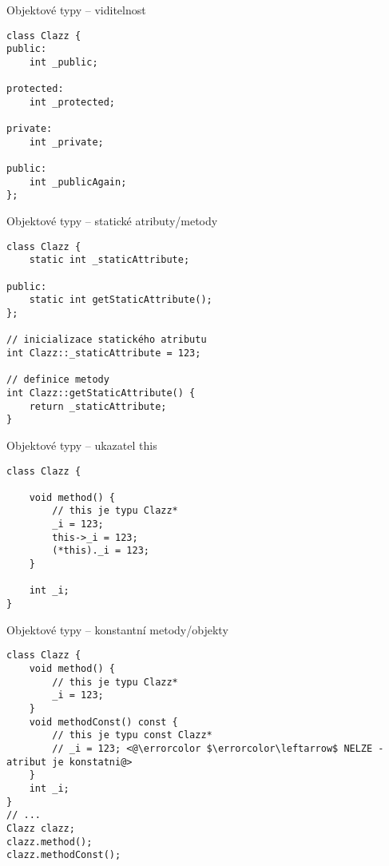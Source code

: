 \begin{frame}[fragile]
\begin{exampleblock}{Objektové typy -- viditelnost} 
\begin{lstlisting}
class Clazz {
public:
	int _public;
	
protected:
	int _protected;
	
private:
	int _private;
	
public:
	int _publicAgain;
};

\end{lstlisting}
\end{exampleblock}
\end{frame}



\begin{frame}[fragile]
\begin{exampleblock}{Objektové typy -- statické atributy/metody} 
\begin{lstlisting}
class Clazz {
	static int _staticAttribute;
	
public:	
	static int getStaticAttribute();
};

// inicializace statického atributu
int Clazz::_staticAttribute = 123;

// definice metody
int Clazz::getStaticAttribute() {
	return _staticAttribute;
}

\end{lstlisting}
\end{exampleblock}
\end{frame}


\begin{frame}[fragile]
\begin{exampleblock}{Objektové typy -- ukazatel this} 
\begin{lstlisting}
class Clazz {
	
	void method() {
		// this je typu Clazz*
		_i = 123;
		this->_i = 123;
		(*this)._i = 123;
	}
	
	int _i;
}

\end{lstlisting}
\end{exampleblock}
\end{frame}

\newcommand{\errorcolor}{\color[rgb]{1.0,0.0,0.0}}

\begin{frame}[fragile]
\begin{exampleblock}{Objektové typy -- konstantní metody/objekty} 
\begin{lstlisting}
class Clazz {
	void method() {
		// this je typu Clazz*
		_i = 123;
	}
	void methodConst() const {
		// this je typu const Clazz*
		// _i = 123; <@\errorcolor $\errorcolor\leftarrow$ NELZE - atribut je konstatni@>
	}
	int _i;
}
// ...
Clazz clazz;
clazz.method();
clazz.methodConst();
\end{lstlisting}
\end{exampleblock}
\end{frame}


